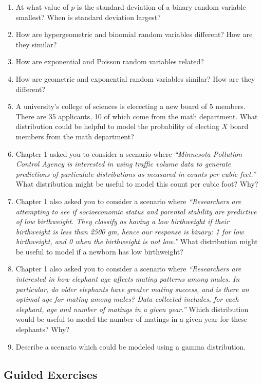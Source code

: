 \documentclass[
]{krantz}
\begin{document}
\begin{enumerate}
\def\labelenumi{\arabic{enumi}.}
\item
  At what value of \(p\) is the standard deviation of a binary random variable smallest? When is standard deviation largest?
\item
  How are hypergeometric and binomial random variables different? How are they similar?
\item
  How are exponential and Poisson random variables related?
\item
  How are geometric and exponential random variables similar? How are they different?
\item
  A university's college of sciences is elececting a new board of 5 members. There are 35 applicants, 10 of which come from the math department. What distribution could be helpful to model the probability of electing \(X\) board members from the math department?
\item
  Chapter 1 asked you to consider a scenario where \emph{``Minnesota Pollution Control Agency is interested in using traffic volume data to generate predictions of particulate distributions as measured in counts per cubic feet.''} What distribution might be useful to model this count per cubic foot? Why?
\item
  Chapter 1 also asked you to consider a scenario where \emph{``Researchers are attempting to see if socioeconomic status and parental stability are predictive of low birthweight. They classify as having a low birthweight if their birthweight is less than 2500 gm, hence our response is binary: 1 for low birthweight, and 0 when the birthweight is not low.''} What distribution might be useful to model if a newborn has low birthweight?
\item
  Chapter 1 also asked you to consider a scenario where \emph{``Researchers are interested in how elephant age affects mating patterns among males. In particular, do older elephants have greater mating success, and is there an optimal age for mating among males? Data collected includes, for each elephant, age and number of matings in a given year.''} Which distribution would be useful to model the number of matings in a given year for these elephants? Why?
\item
  Describe a scenario which could be modeled using a gamma distribution.
\end{enumerate}

\hypertarget{guided-exercises-1}{%
\subsection{Guided Exercises}\label{guided-exercises-1}}
\end{document}
